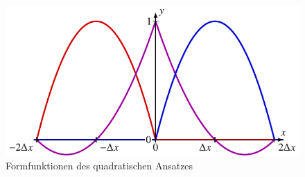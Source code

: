 %
%
%
\begin{figure}
    \centering
    \includegraphics{papers/fem/images/quadratischer_ansatz.pdf}
    \caption{Formfunktionen des quadratischen Ansatzes}
    \end{figure}
    